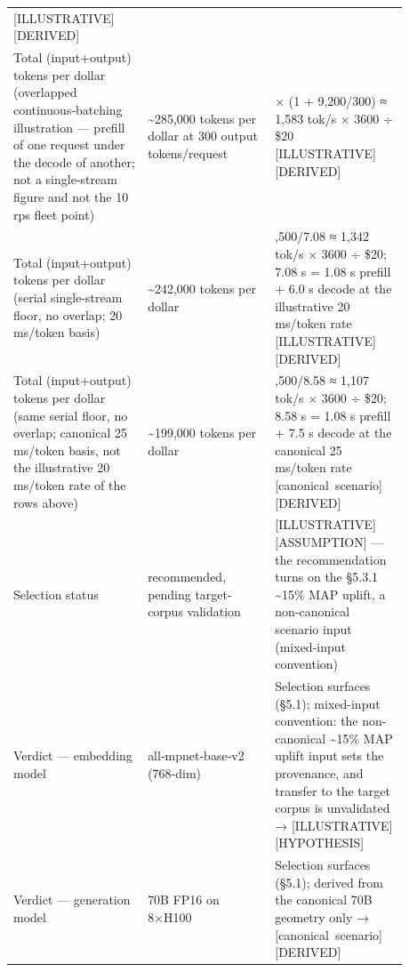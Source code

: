 \begin{longtable}[]{@{}
  >{\raggedright\arraybackslash}p{0.2927\linewidth}
  >{\raggedright\arraybackslash}p{0.2927\linewidth}
  >{\raggedright\arraybackslash}p{0.2927\linewidth}@{}}
\mbox{{[}ILLUSTRATIVE{]}}\hspace{0pt}\mbox{{[}DERIVED{]}} \\
Total (input+output) tokens per dollar (overlapped continuous‑batching
illustration --- prefill of one request under the decode of another; not
a single‑stream figure and not the 10 rps fleet point) &
\textasciitilde285,000 tokens per dollar at 300 output tokens/request &
50 × (1 + 9,200/300) ≈ 1,583 tok/s × 3600 ÷ \$20
\mbox{{[}ILLUSTRATIVE{]}}\hspace{0pt}\mbox{{[}DERIVED{]}} \\
Total (input+output) tokens per dollar (serial single-stream floor, no
overlap; 20 ms/token basis) & \textasciitilde242,000 tokens per dollar &
9,500/7.08 ≈ 1,342 tok/s × 3600 ÷ \$20; 7.08 s = 1.08 s prefill + 6.0 s
decode at the illustrative 20 ms/token rate
\mbox{{[}ILLUSTRATIVE{]}}\hspace{0pt}\mbox{{[}DERIVED{]}} \\
Total (input+output) tokens per dollar (same serial floor, no overlap;
canonical 25 ms/token basis, not the illustrative 20 ms/token rate of
the rows above) & \textasciitilde199,000 tokens per dollar & 9,500/8.58
≈ 1,107 tok/s × 3600 ÷ \$20; 8.58 s = 1.08 s prefill + 7.5 s decode at
the canonical 25 ms/token rate \mbox{{[}canonical scenario{]}}\hspace{0pt}\mbox{{[}DERIVED{]}} \\
Selection status & recommended, pending target-corpus validation &
\mbox{{[}ILLUSTRATIVE{]}}\hspace{0pt}\mbox{{[}ASSUMPTION{]}} --- the recommendation turns on the
§5.3.1 \textasciitilde15\% MAP uplift, a non-canonical scenario input
(mixed-input convention) \\
Verdict --- embedding model & all‑mpnet‑base‑v2 (768‑dim) & Selection
surfaces (§5.1); mixed-input convention: the non-canonical
\textasciitilde15\% MAP uplift input sets the provenance, and transfer
to the target corpus is unvalidated →
\mbox{{[}ILLUSTRATIVE{]}}\hspace{0pt}\mbox{{[}HYPOTHESIS{]}} \\
Verdict --- generation model & 70B FP16 on 8×H100 & Selection surfaces
(§5.1); derived from the canonical 70B geometry only → \mbox{{[}canonical
scenario{]}}\hspace{0pt}\mbox{{[}DERIVED{]}} \\
\end{longtable}

